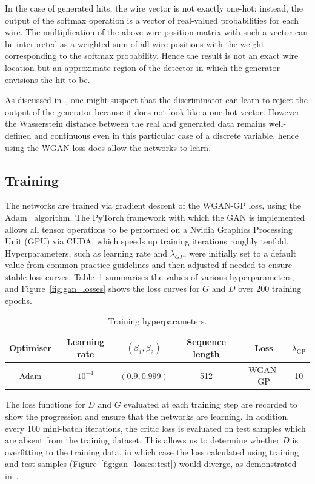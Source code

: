 In the case of generated hits, the wire vector is not exactly one-hot: instead,
the output of the softmax operation is a vector of real-valued probabilities for
each wire. The multiplication of the above wire position matrix with such a
vector can be interpreted as a weighted sum of all wire positions with the
weight corresponding to the softmax probability. Hence the result is not an
exact wire location but an approximate region of the detector in which the
generator envisions the hit to be.

As discussed in~\cite{NIPS2017_892c3b1c}, one might suspect that the
discriminator can learn to reject the output of the generator because it does
not look like a one-hot vector. However the Wasserstein distance between the
real and generated data remains well-defined and continuous even in this
particular case of a discrete variable, hence using the WGAN loss does allow the
networks to learn.


\subsection{Training}
The networks are trained via gradient descent of the WGAN-GP loss, using the
Adam~\cite{Kingma2015AdamAM} algorithm. The PyTorch framework with which the GAN
is implemented allows all tensor operations to be performed on a Nvidia Graphics
Processing Unit (GPU) via CUDA, which speeds up training iterations roughly
tenfold. Hyperparameters, such as learning rate and $\lambda_{GP}$, were
initially set to a default value from common practice guidelines and then
adjusted if needed to ensure stable loss curves.
Table~\ref{tab:training_hyperparameters} summarises the values of various
hyperparameters, and Figure~\ref{fig:gan_losses} shows the loss curves for $G$
and $D$ over 200 training epochs.

\begin{table}[]
    \centering
    \begin{tabular}{cccccc}
        \toprule
        Optimiser & Learning rate & $(\beta_1, \beta_2)$ & Sequence length & Loss &
        $\lambda_\mathrm{GP}$
        \\\midrule 
        Adam & $10^{-4}$ & $(0.9, 0.999)$ & 512 & WGAN-GP & 10
        \\\bottomrule
    \end{tabular}
    \caption{Training hyperparameters.}
    \label{tab:training_hyperparameters}
\end{table}

The loss functions for $D$ and $G$ evaluated at each training step are recorded
to show the progression and ensure that the networks are learning. In addition,
every 100 mini-batch iterations, the critic loss is evaluated on test samples
which are absent from the training dataset. This allows us to determine whether
$D$ is overfitting to the training data, in which case the loss calculated using
training and test samples (Figure~\ref{fig:gan_losses:test}) would diverge, as
demonstrated in~\cite{NIPS2017_892c3b1c}.


